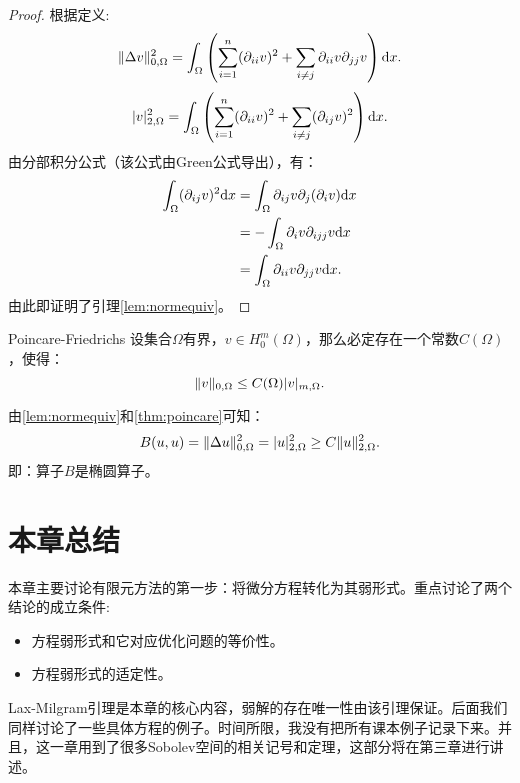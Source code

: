 \begin{proof}
    根据定义:
    \begin{equation}
        \label{eq:totalnorm}
        \|\Delta v\|_{0,\Omega}^{2}=\int_{\Omega}\left(\sum_{i=1}^{n}(\partial_{ii}v)^{2}+\sum_{i\neq j}\partial_{ii}v\partial_{jj}v\right)\mathrm{d} x.
    \end{equation}
    \begin{equation}
        |v|_{2,\Omega}^{2}=\int_{\Omega}\left(\sum_{i=1}^{n}(\partial_{ii}v)^{2}+\sum_{i\neq j}(\partial_{ij}v)^{2}\right)\mathrm{d} x.
    \end{equation}
    由分部积分公式（该公式由Green公式导出），有：
    \begin{equation}
        \begin{aligned}
            \int_{\Omega}(\partial_{ij}v)^{2}\mathrm{d} x&=\int_{\Omega}\partial_{ij}v\partial_{j}(\partial_{i}v)\mathrm{d} x\\
            &=-\int_{\Omega}\partial_{i}v\partial_{ijj}v\mathrm{d} x\\
            &=\int_{\Omega}\partial_{ii}v\partial_{jj}v\mathrm{d} x.
        \end{aligned}
    \end{equation}
    由此即证明了引理\ref{lem:normequiv}。
\end{proof}
\begin{theorem}{Poincare-Friedrichs}
    \label{thm:poincare}
    设集合$\Omega$有界，$v\in H_{0}^{m}(\Omega)$，那么必定存在一个常数$C(\Omega)$，使得：
    \begin{equation}
        \|v\|_{0,\Omega}\le C(\Omega)|v|_{m,\Omega}.
    \end{equation}
\end{theorem}
由\ref{lem:normequiv}和\ref{thm:poincare}可知：
\begin{equation}
    B(u,u)=\|\Delta u\|_{0,\Omega}^{2}=|u|_{2,\Omega}^{2}\ge C\|u\|_{2,\Omega}^{2}.
\end{equation}
即：算子$B$是椭圆算子。
\section{本章总结}
本章主要讨论有限元方法的第一步：将微分方程转化为其弱形式。重点讨论了两个结论的成立条件:
\begin{itemize}
    \item 方程弱形式和它对应优化问题的等价性。
    \item 方程弱形式的适定性。
\end{itemize}
Lax-Milgram引理是本章的核心内容，弱解的存在唯一性由该引理保证。后面我们同样讨论了一些具体方程的例子。时间所限，我没有把所有课本例子记录下来。并且，这一章用到了很多Sobolev空间的相关记号和定理，这部分将在第三章进行讲述。